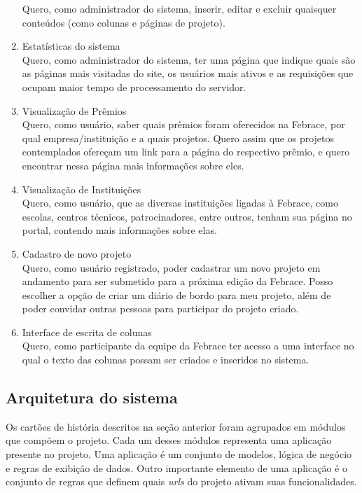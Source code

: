 \begin{enumerate}
        Quero, como administrador do sistema, inserir, editar e excluir quaisquer conteúdos (como colunas e páginas de projeto).
      \item Estatísticas do sistema \\
        Quero, como administrador do sistema, ter uma página que indique quais são as páginas mais visitadas do site, os usuários mais ativos e as requisições que ocupam maior tempo de processamento do servidor.
      \item Visualização de Prêmios \\
        Quero, como usuário, saber quais prêmios foram oferecidos na Febrace, por qual empresa/instituição e a quais projetos. Quero assim que os projetos contemplados ofereçam um link para a página do respectivo prêmio, e quero encontrar nessa página mais informações sobre eles.
      \item Visualização de Instituições \\
        Quero, como usuário, que as diversas instituições ligadas à Febrace, como escolas, centros técnicos, patrocinadores, entre outros, tenham sua página no portal, contendo mais informações sobre elas.
      \item Cadastro de novo projeto \\
        Quero, como usuário registrado, poder cadastrar um novo projeto em andamento para ser submetido para a próxima edição da Febrace. Posso escolher a opção de criar um diário de bordo para meu projeto, além de poder convidar outras pessoas para participar do projeto criado.
      \item Interface de escrita de colunas \\
        Quero, como participante da equipe da Febrace ter acesso a uma interface no qual o texto das colunas possam ser criados e inseridos no sistema.
    \end{enumerate}

  \subsection{Arquitetura do sistema}

    Os cartões de história descritos na seção anterior foram agrupados em módulos que compõem o projeto. Cada um desses módulos representa uma aplicação presente no projeto. Uma aplicação é um conjunto de modelos, lógica de negócio e regras de exibição de dados. Outro importante elemento de uma aplicação é o conjunto de regras que definem quais \textit{urls} do projeto ativam suas funcionalidades.

